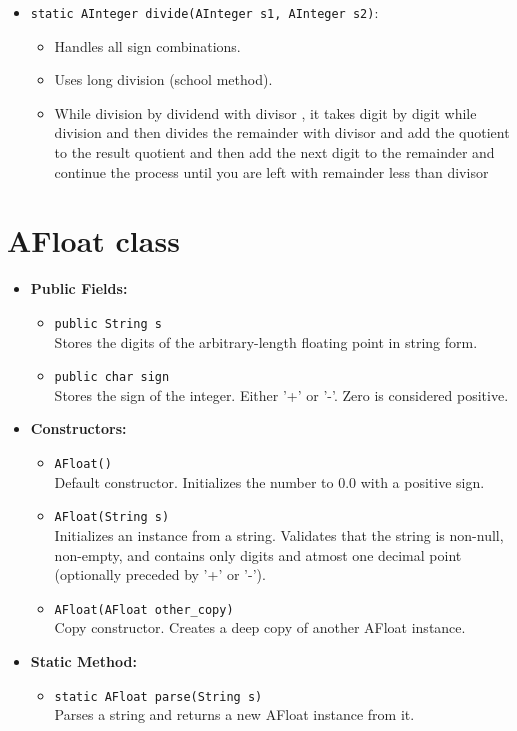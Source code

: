 \documentclass{article}
\begin{document}
\begin{itemize}
    \item \texttt{static AInteger divide(AInteger s1, AInteger s2)}:
    \begin{itemize}
        \item Handles all sign combinations.
        \item Uses long division (school method).
        \item While division by dividend with divisor , it takes digit by digit while division and then divides the remainder with divisor and add the quotient to the result quotient and then add the next digit to the remainder and continue the process until you are left with remainder less than divisor
    \end{itemize}
\end{itemize}


\section{AFloat class}
\begin{itemize}
    \item \textbf{Public Fields:}
    \begin{itemize}
        \item \texttt{public String s} \\
        Stores the digits of the arbitrary-length floating point in string form.

        \item \texttt{public char sign} \\
        Stores the sign of the integer. Either '+' or '-'. Zero is considered positive.
    \end{itemize}

    \item \textbf{Constructors:}
    \begin{itemize}
        \item \texttt{AFloat()} \\
        Default constructor. Initializes the number to 0.0 with a positive sign.

        \item \texttt{AFloat(String s)} \\
        Initializes an instance from a string. Validates that the string is non-null, non-empty, and contains only digits and atmost one decimal point (optionally preceded by '+' or '-').

        \item \texttt{AFloat(AFloat other\_copy)} \\
        Copy constructor. Creates a deep copy of another AFloat instance.
    \end{itemize}

\item \textbf{Static Method:}
    \begin{itemize}
        \item \texttt{static AFloat parse(String s)} \\
        Parses a string and returns a new AFloat instance from it.
    \end{itemize}
\end{itemize}
\end{document}
